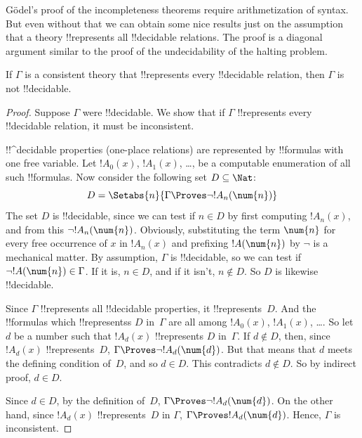 \documentclass[../../../include/open-logic-section]{subfiles}
\begin{document}


G\"odel's proof of the incompleteness theorems require arithmetization
of syntax. But even without that we can obtain some nice results just
on the assumption that a theory !!{represents} all !!{decidable}
relations.  The proof is a diagonal argument similar to the proof of
the undecidability of the halting problem.

\begin{thm}
If $\Gamma$ is a consistent theory that !!{represents} every
!!{decidable} relation, then $\Gamma$ is not !!{decidable}.
\end{thm}

\begin{proof}
Suppose $\Gamma$ were !!{decidable}. We show that if $\Gamma$
!!{represents} every !!{decidable} relation, it must be inconsistent.

!!^{decidable} properties (one-place relations) are represented by
!!{formula}s with one free variable. Let $!A_0(x)$, $!A_1(x)$, \dots,
be a computable enumeration of all such !!{formula}s.  Now consider
the following set $D \subseteq \Nat$:
\[
D = \Setabs{n}{\Gamma \Proves \lnot !A_n(\num{n})}
\]
The set $D$ is !!{decidable}, since we can test if $n \in D$ by first
computing $!A_n(x)$, and from this $\lnot !A_n(\num{n})$. Obviously,
substituting the term $\num{n}$ for every free occurrence of $x$ in
$!A_n(x)$ and prefixing $!A(\num{n})$ by $\lnot$ is a mechanical
matter.  By assumption, $\Gamma$ is !!{decidable}, so we can test if
$\lnot !A(\num{n}) \in \Gamma$. If it is, $n \in D$, and if it isn't,
$n \notin D$. So $D$ is likewise !!{decidable}.

Since $\Gamma$ !!{represents} all !!{decidable} properties, it
!!{represents}~$D$.  And the !!{formula}s which !!{represents}s $D$
in~$\Gamma$ are all among $!A_0(x)$, $!A_1(x)$, \dots. So let $d$ be a
number such that $!A_d(x)$ !!{represents} $D$ in~$\Gamma$.  If $d
\notin D$, then, since $!A_d(x)$ !!{represents}~$D$, $\Gamma \Proves
\lnot !A_d(\num{d})$. But that means that $d$ meets the defining
condition of~$D$, and so $d \in D$. This contradicts $d \notin D$. So
by indirect proof, $d \in D$.

Since $d \in D$, by the definition of~$D$, $\Gamma \Proves \lnot
!A_d(\num{d})$. On the other hand, since $!A_d(x)$ !!{represents}~$D$
in $\Gamma$, $\Gamma \Proves !A_d(\num{d})$. Hence, $\Gamma$ is
inconsistent.
\end{proof}
\end{document}
